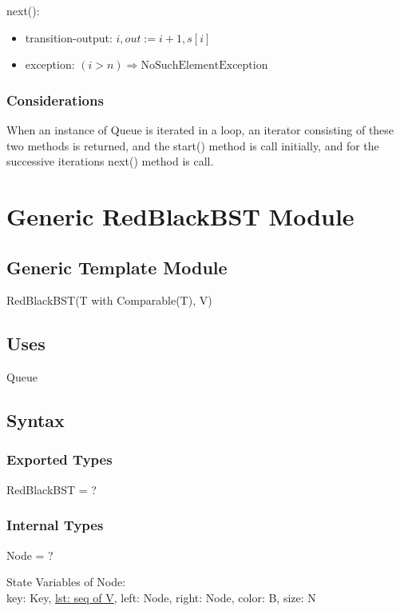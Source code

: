 \documentclass[12pt]{article}
\begin{document}
\noindent next():
\begin{itemize}
\item transition-output: $i, out := i + 1, s[i]$
\item exception: $( i > n) \Rightarrow \text{NoSuchElementException}$
\end{itemize}

\subsubsection* {Considerations}

When an instance of Queue is iterated in a loop, an iterator consisting of these two methods is returned, 
and the start() method is call initially, and for the successive iterations next() method is call.\\

\newpage

\section* {Generic RedBlackBST Module}

\subsection*{Generic Template Module}

RedBlackBST(T with Comparable(T), V)

\subsection* {Uses}

Queue

\subsection* {Syntax}

\subsubsection* {Exported Types}

RedBlackBST = ?

\subsubsection* {Internal Types}

Node = ?

\noindent State Variables of Node:\\
key: Key,
\underline {lst: seq of V},
left: Node,
right: Node,
color: B,
size: N\\
\end{document}
